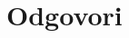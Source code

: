 \begin{vaja}
\begin{odgovor}
\begin{enumerate}
\end{enumerate}
  \end{odgovor}
\end{vaja}






\section{Odgovori}
\label{sec:polinomi-odgovori}




